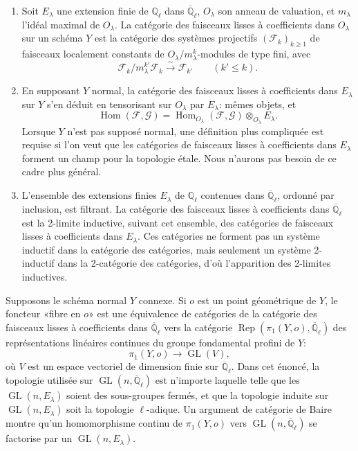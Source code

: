\documentclass[10pt]{article}
\newcommand{\Ql}{\overline{\mathbb Q}_{\ell}}
\newcommand{\GL}{\operatorname{GL}}
\newcommand{\Rep}{\operatorname{Rep}}
\newcommand{\Hom}{\operatorname{Hom}}
\theoremstyle{deligne}
\begin{document}
\begin{enumerate}[label=\alph*)]
\item Soit $E_\lambda$ une extension finie de $\mathbb Q_\ell$ dans $\Ql$, $O_\lambda$ son anneau de valuation, et $m_\lambda$ l'idéal maximal de $O_\lambda$. La catégorie des faisceaux lisses à coefficients dans $O_\lambda$ sur un schéma $Y$ est la catégorie des systèmes projectifs $(\mathcal F_k)_{k\ge1}$ de faisceaux localement constants de $O_\lambda/m_\lambda^k$-modules de type fini, avec
\[
 \mathcal F_k/m_\lambda^{k'}\mathcal F_k\overset{\sim}{\longrightarrow}\mathcal F_{k'}
 \qquad(k'\le k).
\]
\item En supposant $Y$ normal, la catégorie des faisceaux lisses à coefficients dans $E_\lambda$ sur $Y$ s'en déduit en tensorisant sur $O_\lambda$ par $E_\lambda$: mêmes objets, et
\[
 \Hom(\mathcal F,\mathcal G)=\Hom_{O_\lambda}(\mathcal F,\mathcal G)\otimes_{O_\lambda}E_\lambda.
\]
Lorsque $Y$ n'est pas supposé normal, une définition plus compliquée est requise si l'on veut que les catégories de faisceaux lisses à coefficients dans $E_\lambda$ forment un champ pour la topologie \'{e}tale. Nous n'aurons pas besoin de ce cadre plus général.
\item L'ensemble des extensions finies $E_\lambda$ de $\mathbb Q_\ell$ contenues dans $\Ql$, ordonné par inclusion, est filtrant. La catégorie des faisceaux lisses à coefficients dans $\Ql$ est la 2-limite inductive, suivant cet ensemble, des catégories de faisceaux lisses à coefficients dans $E_\lambda$. Ces catégories ne forment pas un système inductif dans la catégorie des catégories, mais seulement un système 2-inductif dans la 2-catégorie des catégories, d'où l'apparition des 2-limites inductives.
\end{enumerate}

Supposons le schéma normal $Y$ connexe. Si $o$ est un point géométrique de $Y$, le foncteur «fibre en $o$» est une équivalence de catégories de la catégorie des faisceaux lisses à coefficients dans $\Ql$ vers la catégorie $\Rep(\pi_1(Y,o),\Ql)$ des représentations linéaires continues du groupe fondamental profini de $Y$:
\[
 \pi_1(Y,o)\longrightarrow\GL(V),
\]
où $V$ est un espace vectoriel de dimension finie sur $\Ql$. Dans cet énoncé, la topologie utilisée sur $\GL(n,\Ql)$ est n'importe laquelle telle que les $\GL(n,E_\lambda)$ soient des sous-groupes fermés, et que la topologie induite sur $\GL(n,E_\lambda)$ soit la topologie $\ell$-adique. Un argument de catégorie de Baire montre qu'un homomorphisme continu de $\pi_1(Y,o)$ vers $\GL(n,\Ql)$ se factorise par un $\GL(n,E_\lambda)$.
\end{document}
